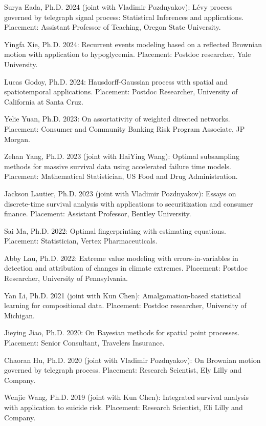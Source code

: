 \documentclass[Statistics]{vita}
\begin{document}
\begin{vita}
\begin{Students}
\begin{Ph.D.}
    \item Surya Eada, Ph.D. 2024 (joint with Vladimir Pozdnyakov): L\'evy process governed by telegraph signal process: Statistical Inferences and applications. Placement: Assistant Professor of Teaching, Oregon State University.
    \item Yingfa Xie, Ph.D. 2024: Recurrent events modeling based on a reflected Brownian motion with application to hypoglycemia. Placement: Postdoc researcher, Yale University.
    \item Lucas Godoy, Ph.D. 2024: Hausdorff-Gaussian process with spatial and spatiotemporal applications. Placement: Postdoc Researcher, University of California at Santa Cruz.
    \item Yelie Yuan, Ph.D. 2023: On assortativity of weighted directed networks. Placement: Consumer and Community Banking Risk Program Associate,  JP Morgan.
    \item Zehan Yang, Ph.D. 2023 (joint with HaiYing Wang): Optimal subsampling methods for massive survival data using accelerated failure time models. Placement: Mathematical Statistician, US Food and Drug Administration.
    \item Jackson Lautier, Ph.D. 2023 (joint with Vladimir Pozdnyakov): Essays on discrete-time survival analysis with applications to securitization and consumer finance. Placement: Assistant Professor, Bentley University. 
    \item Sai Ma, Ph.D. 2022: Optimal fingerprinting with estimating equations. Placement: Statistician, Vertex Pharmaceuticals.
    \item Abby Lau, Ph.D. 2022: Extreme value modeling with errors-in-variables in detection and attribution of changes in climate extremes. Placement: Postdoc Researcher, University of Pennsylvania.
    \item Yan Li, Ph.D. 2021 (joint with Kun Chen): Amalgamation-based statistical learning for compositional data. Placement: Postdoc researcher, University of Michigan.
    \item Jieying Jiao, Ph.D. 2020: On Bayesian methods for spatial point processes. Placement: Senior Consultant, Travelers Insurance.
    \item Chaoran Hu, Ph.D. 2020 (joint with Vladimir Pozdnyakov): On Brownian motion governed by telegraph process. Placement: Research Scientist, Ely Lilly and Company.
    \item Wenjie Wang, Ph.D. 2019 (joint with Kun Chen): Integrated survival analysis with application to suicide risk. Placement: Research Scientist, Eli Lilly and Company.

\end{Ph.D.}
\end{Students}
\end{vita}
\end{document}
